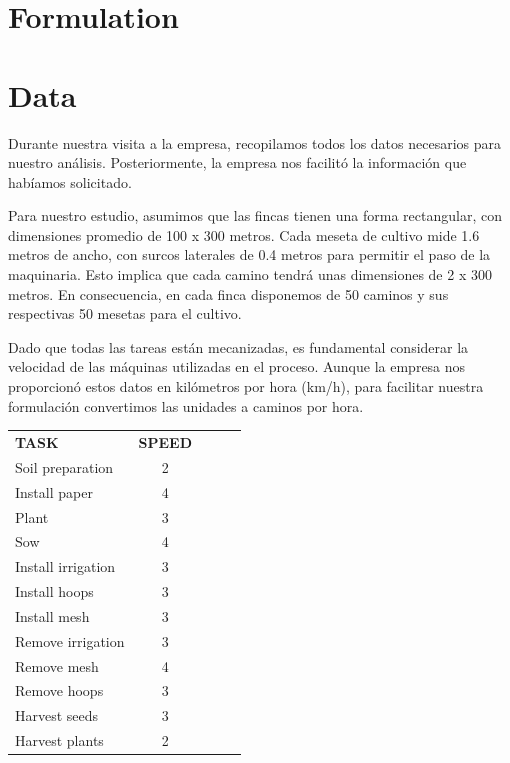 \chapter*{Formulation}


\chapter*{Data}

Durante nuestra visita a la empresa, recopilamos todos los datos necesarios para nuestro análisis. 
Posteriormente, la empresa nos facilitó la información que habíamos solicitado.

Para nuestro estudio, asumimos que las fincas tienen una forma rectangular, con dimensiones promedio
 de 100 x 300 metros. Cada meseta de cultivo mide 1.6 metros de ancho, con surcos laterales de 0.4 metros
  para permitir el paso de la maquinaria. Esto implica que cada camino tendrá unas dimensiones de 2 x 300 metros.
   En consecuencia, en cada finca disponemos de 50 caminos y sus respectivas 50 mesetas para el cultivo.

Dado que todas las tareas están mecanizadas, es fundamental considerar la velocidad de las máquinas utilizadas en el
 proceso. Aunque la empresa nos proporcionó estos datos en kilómetros por hora (km/h), para facilitar nuestra formulación 
 convertimos las unidades a caminos por hora.
 
 \begin{table}[ht!]
    \begin{tabular}{lclll}
    \textbf{TASK}      & \multicolumn{1}{l}{\textbf{SPEED}} \\
    Soil preparation   & 2                                  \\
    Install paper      & 4                                  \\
    Plant              & 3                                  \\
    Sow                & 4                                  \\
    Install irrigation & 3                                  \\
    Install hoops      & 3                                  \\
    Install mesh       & 3                                  \\
    Remove irrigation  & 3                                  \\
    Remove mesh        & 4                                  \\
    Remove hoops       & 3                                  \\
    Harvest seeds      & 3                                  \\
    Harvest plants     & 2                                            
    \end{tabular}
    \end{table}

